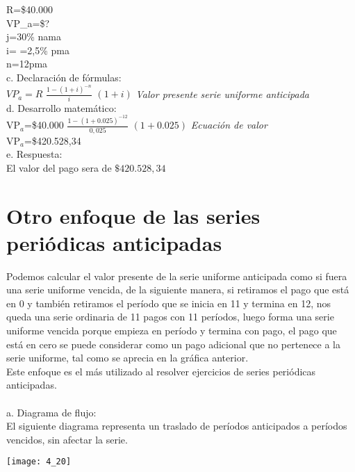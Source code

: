{	R=\$40.000 \\
	VP_{a}=\$?\\
	j=30\% nama \\
	i=  =2,5\% pma\\
	n=12pma\\

c. Declaración de fórmulas:\\

	$VP_{a}=R$ $\frac{1-(1+i)^{-n}}{i}$ $(1+i)$  \hspace{35} \textit{Valor presente serie uniforme anticipada}\\


d. Desarrollo matemático:\\

	VP$_{a}$=\$40.000 $\frac{1-(1+0.025)^{-12}}{0,025}$  $(1+0.025)$ \hspace{35}\textit{Ecuación de valor}\\
	VP$_{a}$=\$420.528,34\\
	
e. Respuesta:\\

El valor del pago sera de $\$420.528,34$\\


\section{Otro enfoque de las series periódicas anticipadas}
Podemos calcular el valor presente de la serie uniforme anticipada como si fuera una serie uniforme vencida, de la siguiente manera, si retiramos el pago que está en 0 y también retiramos el período que se inicia en 11 y termina en 12, nos queda una serie ordinaria de 11 pagos con 11 períodos, luego forma una serie uniforme vencida porque empieza en período y termina con pago, el pago que está en cero se puede considerar como un pago adicional que no pertenece a la serie uniforme, tal como se aprecia en la gráfica anterior.\\

Este enfoque es el más utilizado al resolver ejercicios de series periódicas anticipadas. 
\\\\
a. Diagrama de flujo:\\

El siguiente diagrama representa un traslado de períodos anticipados a períodos vencidos, sin afectar la serie.
\begin{center}
	\texttt{[image: 4\_20]}
\end{center}

}
